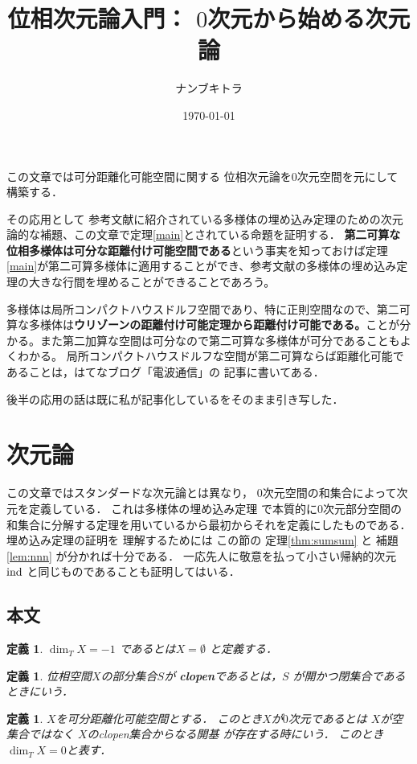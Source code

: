 \documentclass[leqno, a4paper, 12pt]{jsarticle}
\title{
位相次元論入門：
$0$次元から始める次元論
}
\author{ナンブキトラ}
\date{\today}
\newtheorem{df}[thm]{定義}
\newcommand{\ind}{\text{{\rm ind}}}
\begin{document}
\maketitle
この文章では可分距離化可能空間に関する
位相次元論を$0$次元空間を元にして
構築する．


その応用として
参考文献\cite{0}に紹介されている多様体の埋め込み定理のための次元論的な補題、この文章で定理\ref{main}とされている命題を証明する．
\textbf{第二可算な位相多様体は可分な距離付け可能空間である}という事実を知っておけば定理\ref{main}が第二可算多様体に適用することができ、参考文献\cite{0}の多様体の埋め込み定理の大きな行間を埋めることができることであろう。\par
多様体は局所コンパクトハウスドルフ空間であり、特に正則空間なので、第二可算な多様体は\textbf{ウリゾーンの距離付け可能定理から距離付け可能である。}ことが分かる。また第二加算な空間は可分なので第二可算な多様体が可分であることもよくわかる。
局所コンパクトハウスドルフな空間が第二可算ならば距離化可能であることは，はてなブログ「電波通信」の
記事\cite{den4}に書いてある．

後半の応用の話は既に私が記事化している\cite{den3}をそのまま引き写した．
\section{次元論}
この文章ではスタンダードな次元論とは異なり，
$0$次元空間の和集合によって次元を定義している．
これは多様体の埋め込み定理
で本質的に$0$次元部分空間の和集合に分解する定理を用いているから最初からそれを定義にしたものである．
埋め込み定理の証明を
理解するためには
この節の
定理\ref{thm:sumsum}
と
補題
\ref{lem:nnn}
が分かれば十分である．
一応先人に敬意を払って小さい帰納的次元$\ind$
と同じものであることも証明してはいる．

\subsection{本文}
\begin{df}
$\dim_{T} X=-1$
であるとは$X=\emptyset$
と定義する．
\end{df}

\begin{df}
位相空間$X$の部分集合$S$が
\textbf{clopen}であるとは，$S$
が開かつ閉集合であるときにいう．
\end{df}

\begin{df}
$X$を可分距離化可能空間とする．
このとき$X$が$0$次元であるとは
$X$が空集合ではなく
$X$のclopen集合からなる開基
が存在する時にいう．
このとき$\dim_{T} X=0$と表す．
\end{df}
\end{document}
